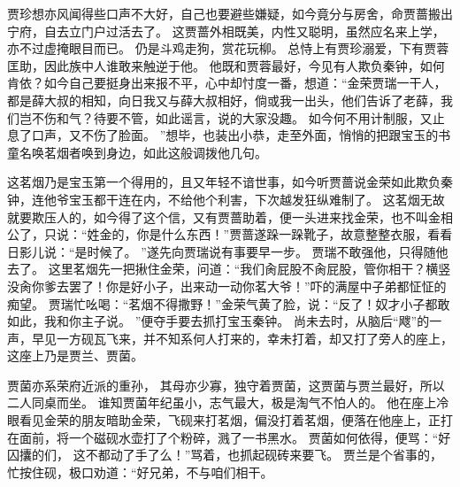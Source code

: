 贾珍想亦风闻得些口声不大好，自己也要避些嫌疑，如今竟分与房舍，命贾蔷搬出宁府，自去立门户过活去了。
这贾蔷外相既美，内性又聪明，虽然应名来上学，亦不过虚掩眼目而已。
仍是斗鸡走狗，赏花玩柳。
总恃上有贾珍溺爱，下有贾蓉匡助，因此族中人谁敢来触逆于他。
他既和贾蓉最好，今见有人欺负秦钟，如何肯依？如今自己要挺身出来报不平，心中却忖度一番，想道：“金荣贾瑞一干人，都是薛大叔的相知，向日我又与薛大叔相好，倘或我一出头，他们告诉了老薛，我们岂不伤和气？待要不管，如此谣言，说的大家没趣。
如今何不用计制服，又止息了口声，又不伤了脸面。
”想毕，也装出小恭，走至外面，悄悄的把跟宝玉的书童名唤茗烟者唤到身边，如此这般调拨他几句。
\par
这茗烟乃是宝玉第一个得用的，且又年轻不谙世事，如今听贾蔷说金荣如此欺负秦钟，连他爷宝玉都干连在内，不给他个利害，下次越发狂纵难制了。
这茗烟无故就要欺压人的，如今得了这个信，又有贾蔷助着，便一头进来找金荣，也不叫金相公了，只说：“姓金的，你是什么东西！”贾蔷遂跺一跺靴子，故意整整衣服，看看日影儿说：“是时候了。
”遂先向贾瑞说有事要早一步。
贾瑞不敢强他，只得随他去了。
这里茗烟先一把揪住金荣，问道：“我们肏屁股不肏屁股，管你\jiji\baba 相干？横竖没肏你爹去罢了！你是好小子，出来动一动你茗大爷！”吓的满屋中子弟都怔怔的痴望。
贾瑞忙吆喝：“茗烟不得撒野！”金荣气黄了脸，说：“反了！奴才小子都敢如此，我和你主子说。
”便夺手要去抓打宝玉秦钟。
尚未去时，从脑后“飕”的一声，早见一方砚瓦飞来，并不知系何人打来的，幸未打着，却又打了旁人的座上，这座上乃是贾兰、贾菌。
\par
贾菌亦系荣府近派的重孙，
其母亦少寡，独守着贾菌，这贾菌与贾兰最好，所以二人同桌而坐。
谁知贾菌年纪虽小，志气最大，极是淘气不怕人的。
他在座上冷眼看见金荣的朋友暗助金荣，飞砚来打茗烟，偏没打着茗烟，便落在他座上，正打在面前，将一个磁砚水壶打了个粉碎，溅了一书黑水。
贾菌如何依得，便骂：“好囚攮的们，
这不都动了手了么！”骂着，也抓起砚砖来要飞。
贾兰是个省事的，忙按住砚，极口劝道：“好兄弟，不与咱们相干。
